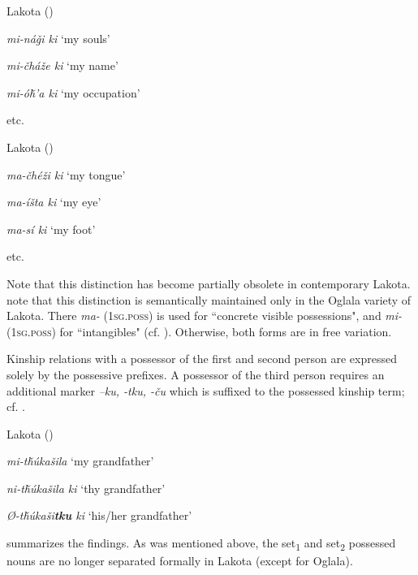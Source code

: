 \documentclass[output=paper]{LSP/langsci}
\begin{document}
\ea Lakota (\citealt[101]{Buechel1939}) \label{lakotaincorporeal}

\textit{mi-ná\v{g}i ki } \hspace{2.1em}		`my souls'

\textit{mi-\v{c}há\v{z}e  ki } \hspace{1.9em} `my name'

\textit{mi-ó\v{h}'a ki}	\hspace{2em}		`my occupation'

etc.

\ex Lakota (\citealt[100]{Buechel1939}) \label{lakotabody}

\textit{ma-\v{c}hé\v{z}i ki } \hspace{1.7em}	`my tongue'

\textit{ma-íšta ki }	 \hspace{2.1em}	`my eye'

\textit{ma-sí ki }		 \hspace{3em}	`my foot'

etc.
\z

Note that this distinction has become partially obsolete in contemporary Lakota. \citet[458]{RoodTaylor1996} note that this distinction is semantically maintained only in the Oglala variety of Lakota. There \textit{ma-} (\textsc{1sg.poss}) is used for ``concrete visible possessions", and \textit{mi-} (\textsc{1sg.poss}) for ``intangibles" (cf. \citealt[458]{RoodTaylor1996}). Otherwise, both forms are in free variation.

Kinship relations with a possessor of the first and second person are expressed solely by the possessive prefixes. A possessor of the third person requires an additional marker \textit{–ku, -tku, -\v{c}u} which is suffixed to the possessed kinship term; cf. .

\ea	Lakota (\citealt[102]{Buechel1939}) \label{lakotamygrandfather}

\textit{mi-t\v{h}\'ukašila} \hspace{3.6em}		`my grandfather'
 
\textit{ni-t\v{h}\'ukašila ki } \hspace{2.3em}	`thy grandfather'

\textit{Ø-t\v{h}\'ukaši\textbf{tku} ki }	\hspace{1.8em} `his/her grandfather'
\z

 summarizes the findings. As was mentioned above, the set\textsubscript{1} and set\textsubscript{2} possessed nouns are no longer separated formally in Lakota (except for Oglala).
\end{document}
